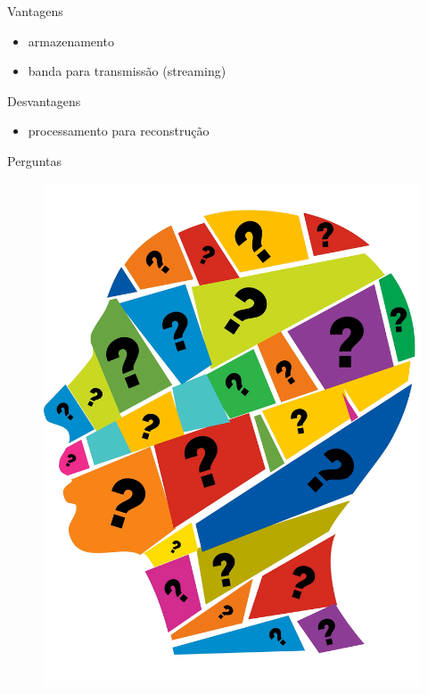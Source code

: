 \documentclass{beamer}
\begin{document}
\begin{frame}{Vantagens}
    \begin{itemize}
        \item armazenamento
        \item banda para transmiss\~ao (streaming)
    \end{itemize}
\end{frame}

\begin{frame}{Desvantagens}
    \begin{itemize}
        \item processamento para reconstru\c{c}\~ao
    \end{itemize}
\end{frame}

\begin{frame}{Perguntas}
    \begin{figure}
        \centering
        \includegraphics[height=\textheight]{figs/perguntas.png}
    \end{figure}
\end{frame}
\end{document}
